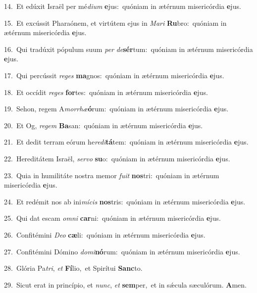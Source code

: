{\numbfont\textcolor{\numbcolor}{14.}}~Et edúxit Israël per mé\-\textit{di}\-\textit{um} \textbf{e}\-jus:~\star quóniam in ætérnum misericórdia \textbf{e}\-jus.\par
{\numbfont\textcolor{\numbcolor}{15.}}~Et excússit Pharaónem, et virtútem ejus in \textit{Ma}\-\textit{ri} \textbf{Ru}\-bro:~\star quóniam in ætérnum misericórdia \textbf{e}\-jus.\par
{\numbfont\textcolor{\numbcolor}{16.}}~Qui tradúxit pópulum suum \textit{per} \textit{de}\-\textbf{sér}tum:~\star quóniam in ætérnum misericórdia \textbf{e}\-jus.\par
{\numbfont\textcolor{\numbcolor}{17.}}~Qui percússit \textit{re}\-\textit{ges} \textbf{ma}\-gnos:~\star quóniam in ætérnum misericórdia \textbf{e}\-jus.\par
{\numbfont\textcolor{\numbcolor}{18.}}~Et occídit \textit{re}\-\textit{ges} \textbf{for}\-tes:~\star quóniam in ætérnum misericórdia \textbf{e}\-jus.\par
{\numbfont\textcolor{\numbcolor}{19.}}~Sehon, regem A\-\textit{mor}\-\textit{rhæ}\textbf{ó}rum:~\star quóniam in ætérnum misericórdia \textbf{e}\-jus.\par
{\numbfont\textcolor{\numbcolor}{20.}}~Et Og, \textit{re}\-\textit{gem} \textbf{Ba}\-san:~\star quóniam in ætérnum misericórdia \textbf{e}\-jus.\par
{\numbfont\textcolor{\numbcolor}{21.}}~Et dedit terram eórum he\-\textit{re}\-\textit{di}\textbf{tá}tem:~\star quóniam in ætérnum misericórdia \textbf{e}\-jus.\par
{\numbfont\textcolor{\numbcolor}{22.}}~Hereditátem Israël, \textit{ser}\-\textit{vo} \textbf{su}\-o:~\star quóniam in ætérnum misericórdia \textbf{e}\-jus.\par
{\numbfont\textcolor{\numbcolor}{23.}}~Quia in humilitáte nostra memor \textit{fu}\-\textit{it} \textbf{nos}\-tri:~\star quóniam in ætérnum misericórdia \textbf{e}\-jus.\par
{\numbfont\textcolor{\numbcolor}{24.}}~Et redémit nos ab ini\-\textit{mí}\-\textit{cis} \textbf{nos}\-tris:~\star quóniam in ætérnum misericórdia \textbf{e}\-jus.\par
{\numbfont\textcolor{\numbcolor}{25.}}~Qui dat escam \textit{om}\-\textit{ni} \textbf{car}\-ni:~\star quóniam in ætérnum misericórdia \textbf{e}\-jus.\par
{\numbfont\textcolor{\numbcolor}{26.}}~Confitémini \textit{De}\-\textit{o} \textbf{cæ}\-li:~\star quóniam in ætérnum misericórdia \textbf{e}\-jus.\par
{\numbfont\textcolor{\numbcolor}{27.}}~Confitémini Dómino \textit{do}\-\textit{mi}\textbf{nó}rum:~\star quóniam in ætérnum misericórdia \textbf{e}\-jus.\par
{\numbfont\textcolor{\numbcolor}{28.}}~Glória Pa\-\textit{tri}\-, \textit{et} \textbf{Fí}\-lio,~\star et Spirítui \textbf{Sanc}\-to.\par
{\numbfont\textcolor{\numbcolor}{29.}}~Sicut erat in princípio, et \textit{nunc}\-, \textit{et} \textbf{sem}\-per,~\star et in sǽcula sæculórum. \textbf{A}\-men.\par
